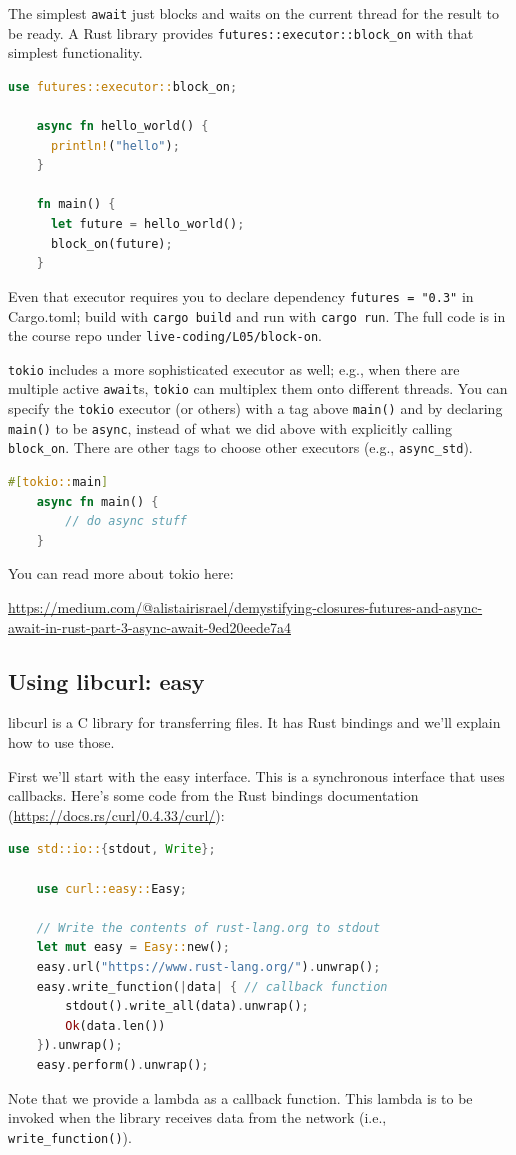 The simplest \texttt{await} just blocks and waits on the current
thread for the result to be ready. A Rust library
provides \texttt{futures::executor::block\_on} with that
simplest functionality.

\begin{lstlisting}[language=Rust]
    use futures::executor::block_on;

    async fn hello_world() {
      println!("hello");
    }

    fn main() {
      let future = hello_world();
      block_on(future);
    }
\end{lstlisting}
Even that executor requires you to declare dependency \texttt{futures = "0.3"}
in Cargo.toml; build with \texttt{cargo build} and run with \texttt{cargo run}. The full code is in the course repo under \texttt{live-coding/L05/block-on}.

\texttt{tokio} includes a more sophisticated executor as well; e.g., when
there are multiple active \texttt{await}s, \texttt{tokio} can multiplex them onto
different threads. You can specify the \texttt{tokio} executor (or others) with a
tag above {\tt main()} and by declaring \texttt{main()} to be \texttt{async},
instead of what we did above with explicitly calling \texttt{block\_on}.
There are other tags to choose other executors (e.g., \texttt{async\_std}).
\begin{lstlisting}[language=Rust]
    #[tokio::main]
    async fn main() {
        // do async stuff
    }
\end{lstlisting}
You can read more about tokio here:
\begin{center}
\url{https://medium.com/@alistairisrael/demystifying-closures-futures-and-async-await-in-rust-part-3-async-await-9ed20eede7a4}
\end{center}

\subsection*{Using libcurl: easy}
libcurl is a C library for transferring files. It has Rust bindings and we'll
explain how to use those.

First we'll start with the easy interface. This is a synchronous interface
that uses callbacks. Here's some code from the Rust bindings documentation
(\url{https://docs.rs/curl/0.4.33/curl/}):

\begin{lstlisting}[language=Rust]
    use std::io::{stdout, Write};

    use curl::easy::Easy;

    // Write the contents of rust-lang.org to stdout
    let mut easy = Easy::new();
    easy.url("https://www.rust-lang.org/").unwrap();
    easy.write_function(|data| { // callback function
        stdout().write_all(data).unwrap();
        Ok(data.len())
    }).unwrap();
    easy.perform().unwrap();
\end{lstlisting}
Note that we provide a lambda as a callback function. This lambda is to be invoked
when the library receives data from the network (i.e., \texttt{write\_function()}).

